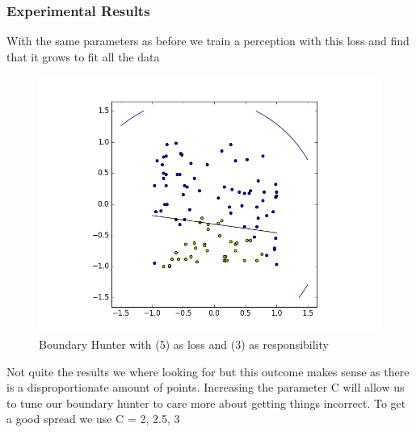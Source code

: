 \documentclass{article}
\begin{document}
\subsubsection{Experimental Results}

With the same parameters as before we train a perception with this loss and find that it grows to fit all the data

\begin{figure}[H]
\centering
  \begin{minipage}[b]{0.4\textwidth}
    \includegraphics[width=\textwidth]{BoundaryHunter-Attempt3-01.png}
    \caption{Boundary Hunter with (5) as loss and (3) as responsibility}
  \end{minipage}
  \hfill
\end{figure}

Not quite the results we where looking for but this outcome makes sense as there is a disproportionate amount of points. Increasing the parameter C will allow us to tune our boundary hunter to care more about getting things incorrect. To get a good spread we use C = 2, 2.5, 3
\end{document}
